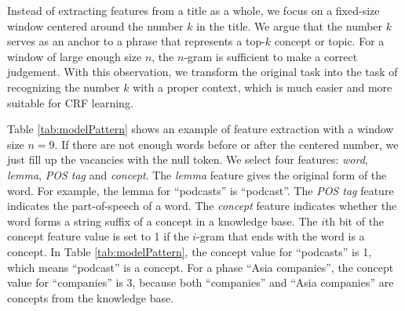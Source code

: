 Instead of extracting features from a title as a whole, we focus on a
fixed-size window centered around the number $k$ in the title. We argue
that the number $k$ serves as an anchor to a phrase that represents
a top-$k$ concept or topic.
For a window of large enough size $n$, the $n$-gram is
sufficient to make a correct judgement.  With this observation,
we transform the original task into the task of recognizing the
number $k$ with a proper context,
which is much easier and more suitable for CRF
learning.  %




Table \ref{tab:modelPattern} shows an example of feature extraction
with a window size $n=9$.  If there are not enough words before or
after the centered number, we just fill up the vacancies with the null
token. We select four features: \emph{word}, \emph{lemma},
\emph{POS tag} and \emph{concept}.  The {\it lemma} feature gives the original
form of the word.  For example, the lemma for ``podcasts'' is
``podcast''.  The {\it POS tag} feature indicates the part-of-speech
of a word.  The {\it concept} feature indicates whether the word
forms a string suffix of a concept in a knowledge base.
The $i$th bit of the concept feature value is set to 1 if the
$i$-gram that ends with the word is a concept.
In Table \ref{tab:modelPattern}, the concept value for
``podcasts'' is 1, which means ``podcast'' is a concept.
For a phase ``Asia companies'', the concept value for
``companies'' is 3, because both ``companies'' and ``Asia companies''
are concepts from the knowledge base.


